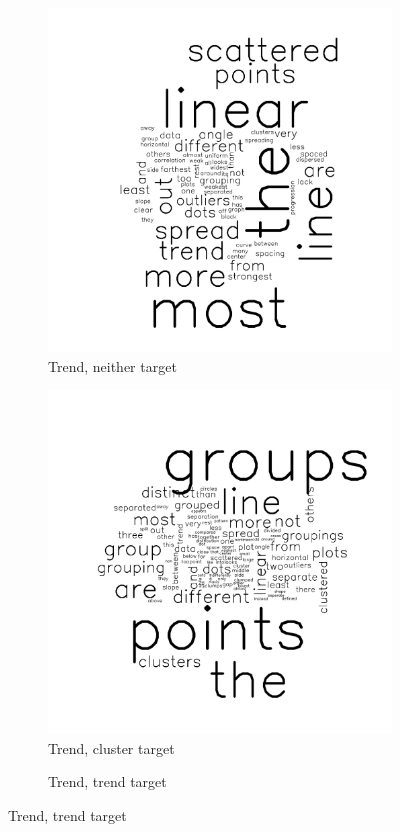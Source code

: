 \documentclass[11pt]{isuthesis}\usepackage[]{graphicx}\usepackage[]{color}
\begin{document}
\begin{figure}[ht]
\begin{subfigure}[t]{0.32\linewidth}\centering
  \caption{Trend, neither target}
  \includegraphics[width=.75\linewidth]{fig-sentiment-4}
\end{subfigure}
\begin{subfigure}[t]{0.32\linewidth}\centering
  \caption{Trend, cluster target}
  \includegraphics[width=.75\linewidth]{fig-sentiment-5}
\end{subfigure}
\begin{subfigure}[t]{0.32\linewidth}\centering
  \caption{Trend, trend target}

\end{subfigure}
\end{figure}
\end{document}
